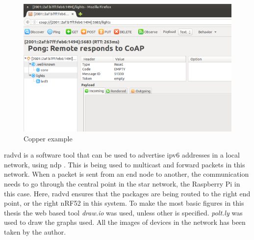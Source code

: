 \begin{figure}[ht]
    \centering
    \includegraphics[width=1.0\textwidth]{CopperExample.png}    
    \caption{Copper example}
    \label{fig:copperExample}
\end{figure}

\noindent \gls{radvd} is a software tool that can be used to advertise \gls{ipv6} addresses in a local network, using \gls{ndp} \cite{chown2011rogue}. This is being used to multicast and forward packets in this network. When a packet is sent from an end node to another, the communication needs to go through the central point in the star network, the Raspberry Pi in this case. Here, \gls{radvd} ensures that the packages are being routed to the right end point, or the right nRF52 in this system. To make the most basic figures in this thesis the web based tool \textit{draw.io} was used, unless other is specified. \textit{polt.ly} was used to draw the graphs used. All the images of devices in the network has been taken by the author. 


